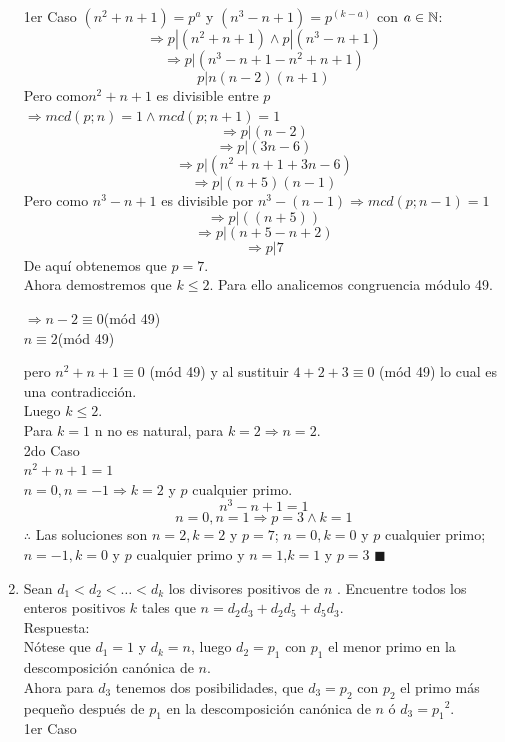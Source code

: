 \documentclass{book}
\begin{document}
\begin{enumerate}
          1er Caso
          $(n^2+n+1)=p^a$ y $(n^3-n+1)=p^{(k-a)}$ con $a\in\mathbb{N}$:
          $$\Rightarrow p|(n^2+n+1)  \wedge  p|(n^3-n+1)$$
          $$\Rightarrow p|(n^3-n+1-n^2+n+1)$$
          $$p|n(n-2)(n+1)$$
          Pero como$ n^2+n+1$ es divisible entre $p$ $\Rightarrow mcd(p;n)=1\wedge mcd(p;n+1)=1$
          $$\Rightarrow p|(n-2)$$
          $$\Rightarrow p|(3n-6)$$
          $$\Rightarrow p|(n^2+n+1+3n-6)$$
          $$\Rightarrow p|(n+5)(n-1)$$
          Pero como $n^3-n+1$ es divisible por $n^3-(n-1)\Rightarrow mcd(p;n-1)=1$
          $$\Rightarrow p|((n+5) )$$
          $$\Rightarrow p|(n+5-n+2)$$
          $$\Rightarrow p|7$$
          De aquí obtenemos que $p=7$.\\
          Ahora demostremos que $k\leq 2$. Para ello analicemos congruencia módulo 49.
          \begin{center}
              $\Rightarrow n-2\equiv 0$(mód 49)\\
              $n\equiv 2$(mód 49)
          \end{center}
          pero $n^2+n+1\equiv 0$ (mód 49) y al sustituir $4+2+3\equiv 0$ (mód 49) lo cual es una contradicción.\\ Luego $k\leq 2$.\\
          Para $k=1$ n no es natural, para $k=2\Rightarrow     n=2$.\\
          2do Caso\\
          $n^2+n+1=1$\\
          $n=0,n=-1 \Rightarrow k=2$ y $p $ cualquier primo.
          $$n^3-n+1=1$$
          $$n=0,n=1\Rightarrow p=3\wedge k=1$$
          $\therefore$ Las soluciones son $n=2,k=2$ y $p=7$; $n=0,k=0$ y $ p$ cualquier primo; $n=-1,k=0$ y $p$ cualquier primo y $n=1$,$k=1$ y $p=3$ $\blacksquare$\\
    \item Sean $d_1<d_2< \ldots  <d_k$  los divisores positivos de $n$ . Encuentre todos los enteros positivos $k$  tales que                        $n=d_2d_3+d_2d_5+d_5d_3$.\\
          Respuesta:\\
          Nótese que $d_1=1$ y $d_k=n$, luego $d_2=p_1$ con $p_1$  el menor primo en la descomposición canónica de $n$.\\
          Ahora para $d_3$ tenemos dos posibilidades, que $d_3=p_2$ con $p_2$ el primo más pequeño después de $p_1$ en la descomposición canónica de $n$ ó $d_3={p_1}^2$.\\
          1er Caso\\

\end{enumerate}
\end{document}
